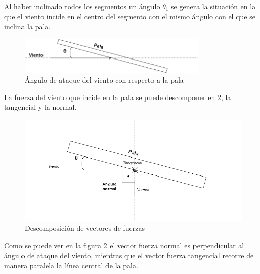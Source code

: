Al haber inclinado todos los segmentos un ángulo $ \theta_1 $ se genera la situación en la que el viento incide en el centro del segmento con el mismo ángulo con el que se inclina la pala. \\

    \textbf{}
    \begin{figure}[H]
    \centering
    \includegraphics[width=0.8\textwidth]{images/dibujo angulo ataque.drawio.png}
    \caption{Ángulo de ataque del viento con respecto a la pala}
    
    \label{fig:dibujo_angulo_ataque}
\end{figure}

La fuerza del viento que incide en la pala se puede descomponer en 2, la tangencial y la normal. \\

    \textbf{}
    \begin{figure}[H]
    \centering
    \includegraphics[width=1\textwidth]{images/dibujo fuerzas.drawio.png}
    \caption{Descomposición de vectores de fuerzas}
    
    \label{fig:dibujo_fuerzas}
\end{figure}


Como se puede ver en la figura \ref{fig:dibujo_fuerzas} el vector fuerza normal es perpendicular al ángulo de ataque del viento, mientras que el vector fuerza tangencial recorre de manera paralela la línea central de la pala.


